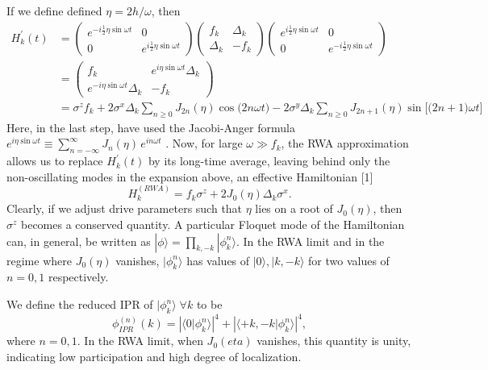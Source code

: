 \documentclass{article}
\begin{document}
If we define defined $\eta=2h/\omega$, then
\begin{align*}
H^\prime_k(t) &= \begin{pmatrix}e^{-i\frac12\eta\sin{\omega t}}&0\\0&e^{i\frac12\eta\sin{\omega t}}\end{pmatrix} \begin{pmatrix}f_k&\Delta_k\\\Delta_k &-f_k\end{pmatrix}\begin{pmatrix}e^{i\frac12\eta\sin{\omega t}}&0\\0&e^{-i\frac12\eta\sin{\omega t}}\end{pmatrix}\\
&= \begin{pmatrix}f_k&e^{i\eta\sin{\omega t}}\Delta_k\\e^{-i\eta\sin{\omega t}}\Delta_k&-f_k\end{pmatrix}\\
&=  \sigma^z f_k + 2\sigma^x \Delta_k \sum_{n\geq 0} J_{2n}(\eta)\cos{\big(2n\omega t\big)} - 2\sigma^y\Delta_k \sum_{n\geq 0} J_{2n+1}(\eta)\sin{\bigg[\big(2n+1\big)\omega t\bigg]}
\end{align*}
Here, in the last step, have used the Jacobi-Anger formula $e^{i \eta \sin{\omega t}} \equiv \sum_{n=-\infty}^{\infty} J_n(\eta)\, e^{i n \omega t}$ \cite{Miao}. Now, for large $\omega \gg f_k$, the RWA approximation allows us to replace $H^\prime_k(t)$ by its long-time average, leaving behind only the non-oscillating modes in the expansion above, an effective Hamiltonian [1]
\begin{equation*}
H^{(RWA)}_k=f_k \sigma^z + 2 J_0(\eta)\Delta_k\sigma^x.
\end{equation*}
Clearly, if we adjust drive parameters such that $\eta$ lies on a root of $J_0(\eta)$, then $\sigma^z$ becomes a conserved quantity. A particular Floquet mode of the Hamiltonian can, in general, be written as $|\phi\rangle = \prod_{k,-k}|\phi^n_k\rangle$. In the RWA limit and in the regime where $J_0(\eta)$ vanishes, $|\phi^n_k\rangle$ has values of $|0\rangle, |k,-k\rangle$ for two values of $n=0,1$ respectively.

We define the reduced IPR of $|\phi^n_k\rangle\; \forall k$ to be
\begin{equation}
\label{eq:redipr:ising}
\phi^{(n)}_{IPR}(k) = \left\vert \langle 0 |\phi^n_k\rangle  \right\vert^4 + \left\vert \langle +k, -k |\phi^n_k\rangle  \right\vert^4,
\end{equation}
where $n=0,1$. In the RWA limit, when $J_0(eta)$ vanishes, this quantity is unity, indicating low participation and high degree of localization.
\end{document}

